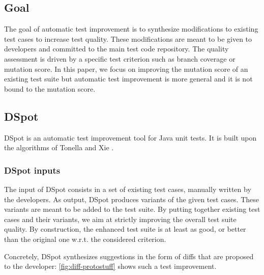 \documentclass[table,xcdraw,smallextended]{svjour3}
\newcommand{\dspot}{DSpot\xspace}
\newcommand{\ms}{mutation score\xspace}
\begin{document}
\subsection{Goal}

The goal of automatic test improvement is to synthesize modifications to existing test cases to increase test quality.
These modifications are meant to be given to developers and committed to the main test code repository.
The quality assessment is driven by a specific test criterion such as branch coverage or \ms.
In this paper, we focus on improving the \ms of an existing test suite but automatic test improvement is more general and it is not bound to the \ms.

\subsection{\dspot}

\dspot is an  automatic test improvement tool for Java unit tests. It is built upon the algorithms of Tonella \cite{tonella} and Xie \cite{TaoXie2006}.

\subsubsection{\dspot inputs}

The input of \dspot consists in a set of existing test cases, manually written by the developers.
As output, \dspot produces variants of the given test cases. These variants are meant to be added to the test suite. By putting together existing test cases and their variants, we aim at strictly improving the overall test suite quality. By construction, the enhanced test suite is at least as good, or better than the original one w.r.t. the considered criterion.

Concretely, \dspot synthesizes suggestions in the form of diffs that are proposed to the developer: \autoref{fig:diff-protostuff} shows such a test improvement.  
\end{document}

